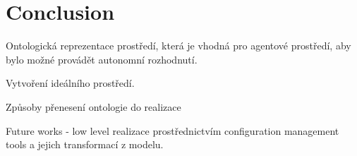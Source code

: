 
\section{Conclusion}

Ontologická reprezentace prostředí, která je vhodná pro agentové prostředí, aby bylo možné provádět autonomní rozhodnutí. 

Vytvoření ideálního prostředí.

Způsoby přenesení ontologie do realizace

Future works - low level realizace prostřednictvím configuration management tools a jejich transformací z modelu.